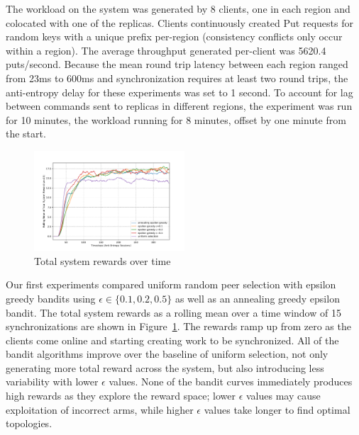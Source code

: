 The workload on the system was generated by 8 clients, one in each region and
colocated with one of the replicas.
Clients continuously created Put requests for random keys with a unique
prefix per-region (consistency conflicts only occur within a region).
The average throughput generated per-client was 5620.4 puts/second.
Because the mean round trip latency between each region ranged from 23ms to
600ms and synchronization requires at least two round trips, the
anti-entropy delay for these experiments was set to 1 second.
To account for lag between commands sent to replicas in different regions,
the experiment was run for 10 minutes, the workload running for 8 minutes,
offset by one minute from the start.

\begin{figure}[t]
    \centering
    \includegraphics[width=0.5\textwidth]{figures/rewards}
    \caption{Total system rewards over time}
    \label{fig:system_rewards}
\end{figure}

Our first experiments compared uniform random peer selection with epsilon
greedy bandits using $\epsilon \in \{0.1, 0.2, 0.5\}$ as well as an annealing
greedy epsilon bandit.
The total system rewards as a rolling mean over a time window of 15
synchronizations are shown in Figure~\ref{fig:system_rewards}.
The rewards ramp up from zero as the clients come online and starting
creating work to be synchronized.
All of the bandit algorithms improve over the baseline of uniform selection,
not only generating more total reward across the system, but also introducing
less variability with lower $\epsilon$ values.
None of the bandit curves immediately produces high rewards as they explore
the reward space; lower $\epsilon$ values may cause exploitation of incorrect
arms, while higher $\epsilon$ values take longer to find optimal topologies.

